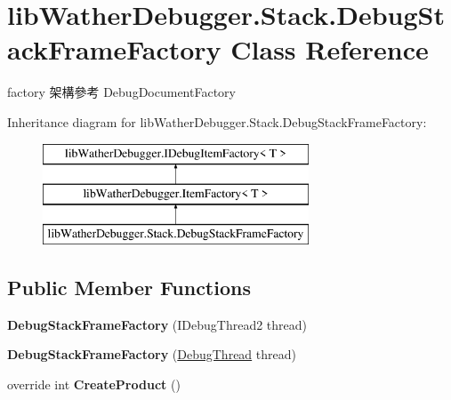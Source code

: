 \hypertarget{classlib_wather_debugger_1_1_stack_1_1_debug_stack_frame_factory}{\section{lib\+Wather\+Debugger.\+Stack.\+Debug\+Stack\+Frame\+Factory Class Reference}
\label{classlib_wather_debugger_1_1_stack_1_1_debug_stack_frame_factory}
}


factory 架構參考 Debug\+Document\+Factory  


Inheritance diagram for lib\+Wather\+Debugger.\+Stack.\+Debug\+Stack\+Frame\+Factory\+:\begin{figure}[H]
\begin{center}
\leavevmode
\includegraphics[height=3.000000cm]{classlib_wather_debugger_1_1_stack_1_1_debug_stack_frame_factory}
\end{center}
\end{figure}
\subsection*{Public Member Functions}
\begin{DoxyCompactItemize}
\item 
\hypertarget{classlib_wather_debugger_1_1_stack_1_1_debug_stack_frame_factory_ab10871baa9871248a0ea4e5e41a31114}{{\bfseries Debug\+Stack\+Frame\+Factory} (I\+Debug\+Thread2 thread)}\label{classlib_wather_debugger_1_1_stack_1_1_debug_stack_frame_factory_ab10871baa9871248a0ea4e5e41a31114}

\item 
\hypertarget{classlib_wather_debugger_1_1_stack_1_1_debug_stack_frame_factory_a9b4d323694e1eb0e79cbfb25a0210bd0}{{\bfseries Debug\+Stack\+Frame\+Factory} (\hyperlink{classlib_wather_debugger_1_1_thread_1_1_debug_thread}{Debug\+Thread} thread)}\label{classlib_wather_debugger_1_1_stack_1_1_debug_stack_frame_factory_a9b4d323694e1eb0e79cbfb25a0210bd0}

\item 
\hypertarget{classlib_wather_debugger_1_1_stack_1_1_debug_stack_frame_factory_ad575ca6f166c1d23643f4126885169d5}{override int {\bfseries Create\+Product} ()}\label{classlib_wather_debugger_1_1_stack_1_1_debug_stack_frame_factory_ad575ca6f166c1d23643f4126885169d5}

\end{DoxyCompactItemize}
